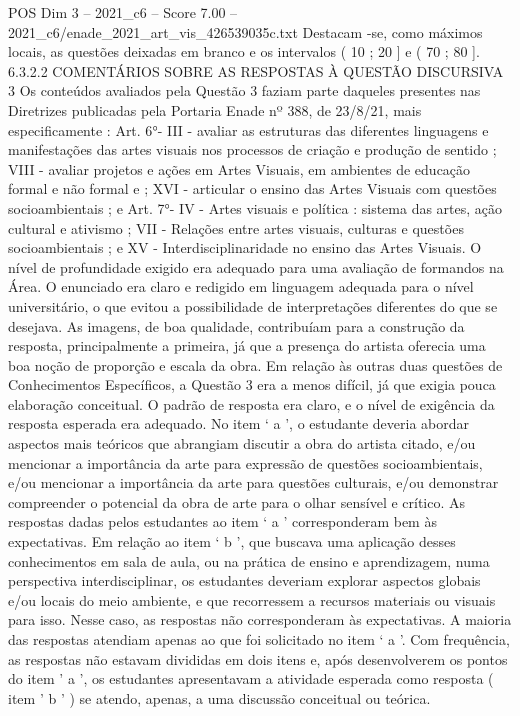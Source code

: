\begin{textsample}{POS Dim 3 – 2021\_c6 – Score 7.00 – 2021\_c6/enade\_2021\_art\_vis\_426539035c.txt}
Destacam -se, como máximos locais, as questões deixadas em branco e os intervalos ( 10 ; 20 ] e ( 70 ; 80 ]. 6.3.2.2 COMENTÁRIOS SOBRE AS RESPOSTAS À QUESTÃO DISCURSIVA 3 Os conteúdos avaliados pela Questão 3 faziam parte daqueles presentes nas Diretrizes publicadas pela Portaria Enade nº 388, de 23/8/21, mais especificamente : Art. 6{\EmojiFont °}- III - avaliar as estruturas das diferentes linguagens e manifestações das artes visuais nos processos de criação e produção de sentido ; VIII - avaliar projetos e ações em Artes Visuais, em ambientes de educação formal e não formal e ; XVI - articular o ensino das Artes Visuais com questões socioambientais ; e Art. 7{\EmojiFont °}- IV - Artes visuais e política : sistema das artes, ação cultural e ativismo ; VII - Relações entre artes visuais, culturas e questões socioambientais ; e XV - Interdisciplinaridade no ensino das Artes Visuais.
O nível de profundidade exigido era adequado para uma avaliação de formandos na Área.
O enunciado era claro e redigido em linguagem adequada para o nível universitário, o que evitou a possibilidade de interpretações diferentes do que se desejava.
As imagens, de boa qualidade, contribuíam para a construção da resposta, principalmente a primeira, já que a presença do artista oferecia uma boa noção de proporção e escala da obra.
Em relação às outras duas questões de Conhecimentos Específicos, a Questão 3 era a menos difícil, já que exigia pouca elaboração conceitual.
O padrão de resposta era claro, e o nível de exigência da resposta esperada era adequado.
No item ‘ a ’, o estudante deveria abordar aspectos mais teóricos que abrangiam discutir a obra do artista citado, e/ou mencionar a importância da arte para expressão de questões socioambientais, e/ou mencionar a importância da arte para questões culturais, e/ou demonstrar compreender o potencial da obra de arte para o olhar sensível e crítico.
As respostas dadas pelos estudantes ao item ‘ a ’ corresponderam bem às expectativas.
Em relação ao item ‘ b ’, que buscava uma aplicação desses conhecimentos em sala de aula, ou na prática de ensino e aprendizagem, numa perspectiva interdisciplinar, os estudantes deveriam explorar aspectos globais e/ou locais do meio ambiente, e que recorressem a recursos materiais ou visuais para isso.
Nesse caso, as respostas não corresponderam às expectativas.
A maioria das respostas atendiam apenas ao que foi solicitado no item ‘ a ’.
Com frequência, as respostas não estavam divididas em dois itens e, após desenvolverem os pontos do item ' a ', os estudantes apresentavam a atividade esperada como resposta ( item ' b ' ) se atendo, apenas, a uma discussão conceitual ou teórica.

\end{textsample}
